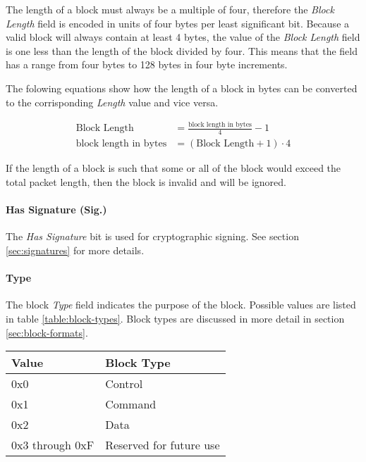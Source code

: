 The length of a block must always be a multiple of four, therefore the
\emph{Block Length} field is encoded in units of four bytes per least
significant bit. Because a valid block will always contain at least 4 bytes, the
value of the \emph{Block Length} field is one less than the length of the block
divided by four. This means that the field has a range from four bytes to 128
bytes in four byte increments.

The folowing equations show how the length of a block in bytes can be converted
to the corrisponding \emph{Length} value and vice versa.

\begin{align*} 
\text{Block Length} &= \frac{\text{block length in bytes}}{4} - 1 \\
\text{block length in bytes} &= \left(\text{Block Length} + 1\right) \cdot 4
\end{align*}

If the length of a block is such that some or all of the block would exceed the
total packet length, then the block is invalid and will be ignored.

\paragraph{Has Signature (Sig.)}
The \emph{Has Signature} bit is used for cryptographic signing. See
section \ref{sec:signatures} for more details.

\paragraph{Type}
The block \emph{Type} field indicates the purpose of the block. Possible values
are listed in table \ref{table:block-types}. Block types are discussed in more
detail in section \ref{sec:block-formats}.

\begin{table*}
\centering
\begin{tabular}{@{}ll@{}}
\toprule
Value           &   Block Type \\
\midrule
0x0             &   Control \\
0x1             &   Command \\
0x2             &   Data \\
0x3 through 0xF &   Reserved for future use \\
\bottomrule
\end{tabular}
\caption{Block types}
\label{table:block-types}
\end{table*}

